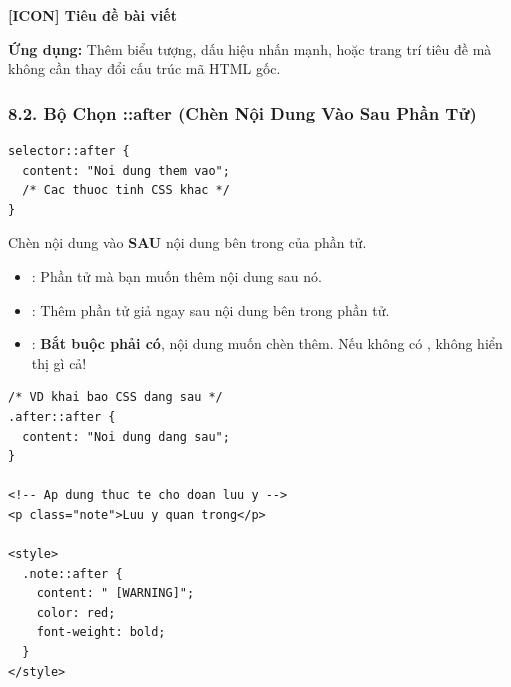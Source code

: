 \begin{browserWindow}
\sffamily\Large\bfseries
[ICON] Tiêu đề bài viết
\end{browserWindow}

\begin{conceptBox}
\textbf{Ứng dụng:} Thêm biểu tượng, dấu hiệu nhấn mạnh, hoặc trang trí tiêu đề mà không cần thay đổi cấu trúc mã HTML gốc.
\end{conceptBox}

\subsubsection{8.2. Bộ Chọn ::after (Chèn Nội Dung Vào Sau Phần Tử)}

\begin{codeWindow}
\begin{lstlisting}[language=CSS3]
selector::after {
  content: "Noi dung them vao";
  /* Cac thuoc tinh CSS khac */
}
\end{lstlisting}
\end{codeWindow}

\begin{conceptBox}
Chèn nội dung vào \textbf{SAU} nội dung bên trong của phần tử.
\begin{itemize}[leftmargin=1.5em, itemsep=3pt, parsep=0pt]
    \item {}: Phần tử mà bạn muốn thêm nội dung sau nó.
    \item {}: Thêm phần tử giả ngay sau nội dung bên trong phần tử.
    \item {}: \textbf{Bắt buộc phải có}, nội dung muốn chèn thêm. Nếu không có ,  không hiển thị gì cả!
\end{itemize}
\end{conceptBox}

\begin{codeWindow}
\begin{lstlisting}[language=HTML5]
/* VD khai bao CSS dang sau */
.after::after {
  content: "Noi dung dang sau";
}

<!-- Ap dung thuc te cho doan luu y -->
<p class="note">Luu y quan trong</p>

<style>
  .note::after {
    content: " [WARNING]";
    color: red;
    font-weight: bold;
  }
</style>
\end{lstlisting}
\end{codeWindow}

